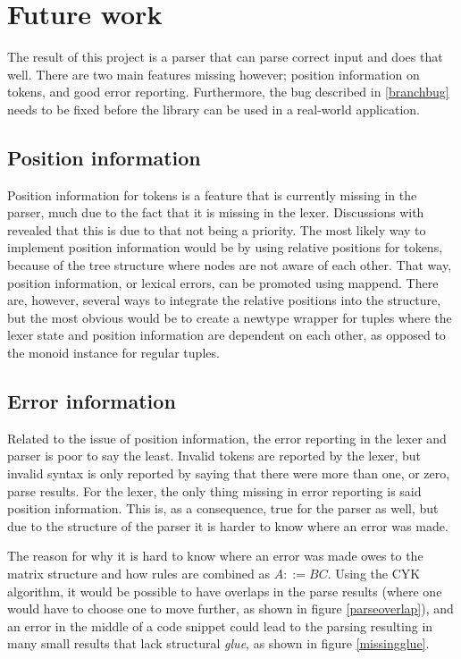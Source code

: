 \documentclass[a4paper,12pt,twosided]{report}
\begin{document}
\section{Future work}
\label{futurework}
The result of this project is a parser that can parse correct input and does
that well. There are two main features missing however; position information on
tokens, and good error reporting. Furthermore, the bug described in
\ref{branchbug} needs to be fixed before the library can be used in a real-world
application.

\subsection{Position information}
Position information for tokens is a feature that is currently missing in the
parser, much due to the fact that it is missing in the lexer. Discussions with
\citeauthor{divconqlex} revealed that this is due to that not being a priority.
The most likely way to implement position information would be by using relative
positions for tokens, because of the tree structure where nodes are not aware of
each other. That way, position information, or lexical errors, can be promoted
using mappend. There are, however, several ways to integrate the relative
positions into the structure, but the most obvious would be to create a newtype
wrapper for tuples where the lexer state and position information are dependent
on each other, as opposed to the monoid instance for regular tuples. 

\subsection{Error information}
Related to the issue of position information, the error reporting in the lexer
and parser is poor to say the least. Invalid tokens are reported by the lexer,
but invalid syntax is only reported by saying that there were more than one, or
zero, parse results. For the lexer, the only thing missing in error reporting is
said position information. This is, as a consequence, true for the parser as
well, but due to the structure of the parser it is harder to know where an error
was made.

The reason for why it is hard to know where an error was made owes to the matrix
structure and how rules are combined as $A ::= BC$. Using the CYK algorithm, it
would be possible to have overlaps in the parse results (where one would have to
choose one to move further, as shown in figure \ref{parseoverlap}), and an error
in the middle of a code snippet could lead to the parsing resulting in many
small results that lack structural \textit{glue}, as shown in figure
\ref{missingglue}. 
\end{document}
